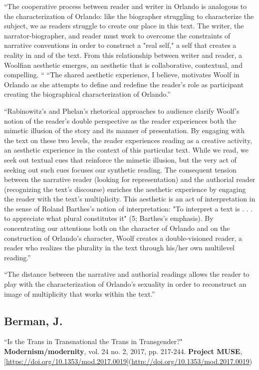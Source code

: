 \documentclass[11pt]{article}
\begin{document}
“The cooperative process between reader and writer in Orlando is
analogous to the characterization of Orlando: like the biographer
struggling to characterize the subject, we as readers struggle to
create our place in this text. The writer, the narrator-biographer,
and reader must work to overcome the constraints of narrative
conventions in order to construct a "real self," a self that creates a
reality in and of the text. From this relationship between writer and
reader, a Woolfian aesthetic emerges, an aesthetic that is
collaborative, contextual, and compelling. “ “The shared aesthetic
experience, I believe, motivates Woolf in Orlando as she attempts to
define and redefine the reader's role as participant creating the
biographical characterization of Orlando.”

“Rabinowitz's and Phelan's rhetorical approaches to audience clarify
Woolf's notion of the reader's double perspective as the reader
experiences both the mimetic illusion of the story and its manner of
presentation. By engaging with the text on these two levels, the
reader experiences reading as a creative activity, an aesthetic
experience in the context of this particular text. While we read, we
seek out textual cues that reinforce the mimetic illusion, but the
very act of seeking out such cues focuses our synthetic reading. The
consequent tension between the narrative reader (looking for
representation) and the authorial reader (recognizing the text's
discourse) enriches the aesthetic experience by engaging the reader
with the text's multiplicity. This aesthetic is an act of
interpretation in the sense of Roland Barthes's notion of
interpretation: "To interpret a text is . . . to appreciate what
plural constitutes it" (5; Barthes's emphasis). By concentrating our
attentions both on the character of Orlando and on the construction of
Orlando's character, Woolf creates a double-visioned reader, a reader
who realizes the plurality in the text through his/her own multilevel
reading.”

“The distance between the narrative and authorial readings allows the
reader to play with the characterization of Orlando's sexuality in
order to reconstruct an image of multiplicity that works within the
text.”

\subsection{Berman, J.}
\label{sec:org535ad1a}
“Is the Trans in Transnational the Trans in Transgender?"
\textbf{Modernism/modernity}, vol. 24 no. 2, 2017, pp. 217-244. \textbf{Project
MUSE},
[\url{https://doi.org/10.1353/mod.2017.0019}](\url{http://doi.org/10.1353/mod.2017.0019})
\end{document}
